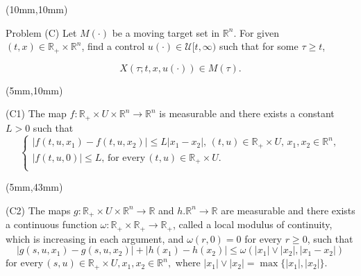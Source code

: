 \documentclass[10pt]{beamer}
\begin{document}
\begin{frame}

\begin{textblock*}{110mm}(10mm,10mm)
	\begin{graybox}{Problem (C)}
		Let $M(\cdot)$ be a moving target set in $\mathbb{R}^n$. For given $(t,x)\in \mathbb{R}_{+}\times \mathbb{R}^n$, find a control $u(\cdot)\in \mathcal{U}[		t,	\infty)$ 		such that for some $\tau \geq t$,

		$$X(\tau;t,x,u(\cdot))\in M(\tau).$$
	\end{graybox}
\end{textblock*}

\end{frame}

\begin{frame}
\begin{textblock*}{120mm}(5mm,10mm)
	\begin{graybox}{(C1)}
		The map $f:\mathbb{R}_{+}\times U\times \mathbb{R}^n\rightarrow \mathbb{R}^n$ is measurable and there exists a constant $L>0$ such that
				$$\left\{ \begin{array}{l}
				|f(t,u,x_1)-f(t,u,x_2)|\leq L|x_1-x_2|,\, (t,u)\in \mathbb{R}_{+}\times U,\, x_1,x_2\in \mathbb{R}^n,\\
				|f(t,u,0)|\leq L,\,\mbox{for every}\,(t,u)\in \mathbb{R}_{+}\times U .\\
				\end{array}
				\right.$$
	\end{graybox}
\end{textblock*}

\begin{textblock*}{120mm}(5mm,43mm)
	\begin{graybox}{(C2)}
		The maps $g:\mathbb{R}_{+}\times U\times \mathbb{R}^n\rightarrow \mathbb{R}$ and $h.\mathbb{R}^n\rightarrow \mathbb{R}$ are measurable and there exists a continuous function $\omega:\mathbb{R}_{+}\times\mathbb{R}_{+}\rightarrow \mathbb{R}_{+}$, called a local modulus of continuity, which is increasing in each argument, and $\omega(r,0)=0$ for every $r\geq 0$, such that 
$$|g(s,u,x_1)-g(s,u,x_2)|+|h(x_1)-h(x_2)|\leq \omega(|x_1|\vee |x_2|,|x_1-x_2|)$$
$\mbox{for every}\, (s,u)\in \mathbb{R}_{+}\times U,x_1,x_2\in \mathbb{R}^n,$ where $|x_1|\vee |x_2|=\max\{|x_1|,|x_2|\}$.
	\end{graybox}
\end{textblock*}
\end{frame}
\end{document}
